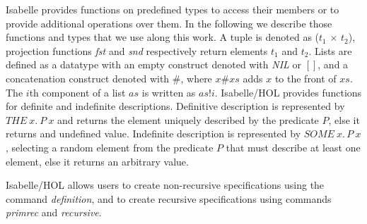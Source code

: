 Isabelle provides functions on predefined types to access their members or to provide additional operations over them. In the following we describe those functions and types that we use along this work. A tuple is denoted as (\emph{$t_1$} $\times$ \emph{$t_2$}), projection functions \emph{fst} and \emph{snd} respectively return elements $t_1$ and $t_2$. Lists are defined as a datatype with an empty construct denoted with \emph{NIL} or $[]$, and a concatenation construct denoted with $\#$, where $x\#xs$ adds $x$ to the front of $xs$. The $i$th component of a list $as$ is written as $as!i$. Isabelle/HOL provides functions for definite and indefinite descriptions. Definitive description is represented by $THE\ x.\ P\ x$ and returns the element uniquely described by the predicate $P$, else it returns and undefined value. Indefinite description is represented by $SOME\ x.\, P\ x$, selecting a random element from the predicate $P$ that must describe at least one element, else it returns an arbitrary value.

Isabelle/HOL allows users to create non-recursive specifications using the command \emph{definition}, and to create recursive specifications using commands \emph{primrec} and \emph{recursive}.
